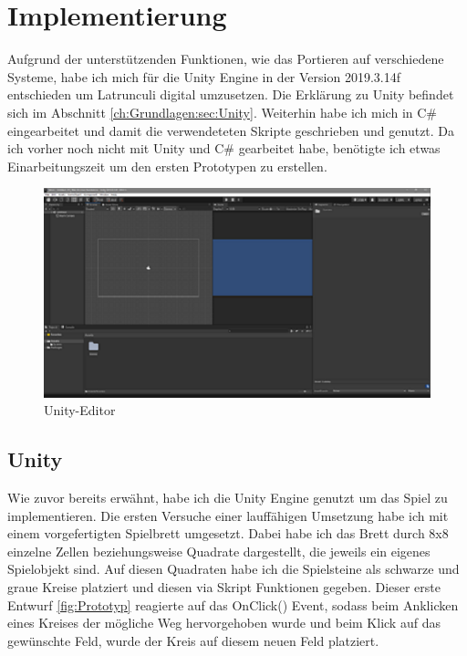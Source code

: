 
\chapter{Implementierung}
\label{ch:Implementierung}

Aufgrund der unterstützenden Funktionen, wie das Portieren auf verschiedene Systeme, habe ich mich für die Unity Engine in der Version 2019.3.14f entschieden um Latrunculi digital umzusetzen. Die Erklärung zu Unity befindet sich im Abschnitt \ref{ch:Grundlagen:sec:Unity}. Weiterhin habe ich mich in C\# eingearbeitet und damit die verwendeteten Skripte geschrieben und genutzt. Da ich vorher noch nicht mit Unity und C\# gearbeitet habe, benötigte ich etwas Einarbeitungszeit um den ersten Prototypen zu erstellen.

\begin{figure}[h]
	\centering
	\includegraphics{img/Unity-Editor}
	\caption{Unity-Editor}
	\label{fig:Editor}
\end{figure}

\section{Unity}
\label{ch:Implementierung:sec:Unity}

Wie zuvor bereits erwähnt, habe ich die Unity Engine genutzt um das Spiel zu implementieren. Die ersten Versuche einer lauffähigen Umsetzung habe ich mit einem vorgefertigten Spielbrett umgesetzt. Dabei habe ich das Brett durch 8x8 einzelne Zellen beziehungsweise Quadrate dargestellt, die jeweils ein eigenes Spielobjekt sind. Auf diesen Quadraten habe ich die Spielsteine als schwarze und graue Kreise platziert und diesen via Skript Funktionen gegeben. Dieser erste Entwurf \ref{fig:Prototyp} reagierte auf das OnClick() Event, sodass beim Anklicken eines Kreises der mögliche Weg hervorgehoben wurde und beim Klick auf das gewünschte Feld, wurde der Kreis auf diesem neuen Feld platziert.

